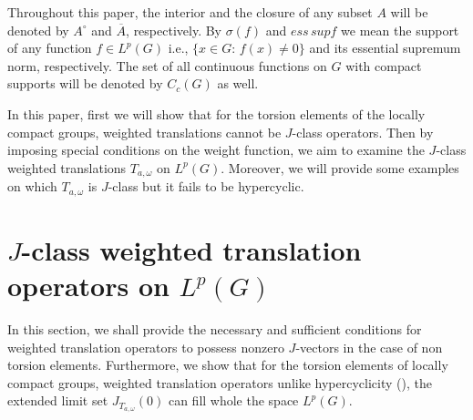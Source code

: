\documentclass{amsart}
\theoremstyle{definition}\newtheorem{defn}[thm]{Definition}
\theoremstyle{remark}
\numberwithin{equation}{section}
\begin{document}
Throughout this paper, the interior and the closure of any subset
$A$ will be denoted by $A^\circ$ and $\overline{A}$, respectively.
By $\sigma(f)$ and $ess\,sup f$ we mean the support of any function
$f\in L^p(G)$ i.e., $\{x\in G: \, f(x)\neq 0\}$ and its essential
supremum norm, respectively. The set of all continuous functions on
$G$ with compact supports will be denoted by $C_c(G)$ as well.

In this paper, first we will show that for the torsion elements of
the locally compact
 groups,  weighted translations  cannot be  $J$-class operators.
Then by imposing special conditions on the weight function, we aim
to examine the $J$-class weighted translations $ T_{a,\omega}$ on
$L^p(G)$. Moreover, we will provide some examples on which
$T_{a,\omega}$ is $J$-class but it fails to be hypercyclic.





\section{\textbf{$J$-class  weighted translation operators on  $ L^p(G) $}}
 In this section,  we shall provide the necessary and sufficient conditions for
 weighted translation operators to  possess nonzero $J$-vectors
  in the case of non torsion elements. Furthermore,
 we show that for the torsion elements of  locally compact
 groups, weighted translation operators unlike hypercyclicity
 (\cite[Lemma 1.1]{chu}), the extended limit set  $J_{T_{a,\omega}}(0)$
  can fill whole the space $L^p(G)$.


\end{document}
